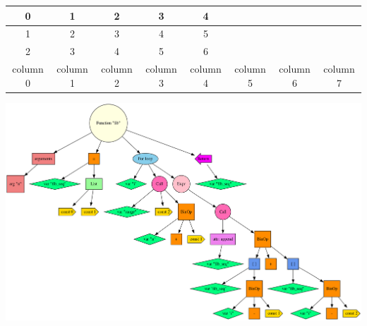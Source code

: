 \documentclass[12pt]{article}
\begin{document}
 
\begin{tabular}{ |c|c|c|c|c|c|c|c| } 
\hline 
0 & 1 & 2 & 3 & 4 \\
\hline 
1 & 2 & 3 & 4 & 5 \\
\hline 
2 & 3 & 4 & 5 & 6 \\
\hline 
column 0 & column 1 & column 2 & column 3 & column 4 & column 5 & column 6 & column 7 \\
\hline 
\end{tabular}
\includegraphics[scale=0.4]{ast.png} 
\end{document}
